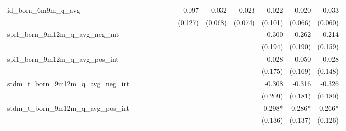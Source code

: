 \begin{tabular}{lrrrrrrrrrrrr}
id\_born\_6m9m\_q\_avg                      &              &              &              &              &              &              &       -0.097 &       -0.032 &       -0.023 &       -0.022 &       -0.020 &       -0.033 \\ 
                                            &              &              &              &              &              &              &      (0.127) &      (0.068) &      (0.074) &      (0.101) &      (0.066) &      (0.060) \\ 
spi1\_born\_9m12m\_q\_avg\_neg\_int         &              &              &              &              &              &              &              &              &              &       -0.300 &       -0.262 &       -0.214 \\ 
                                            &              &              &              &              &              &              &              &              &              &      (0.194) &      (0.190) &      (0.159) \\ 
spi1\_born\_9m12m\_q\_avg\_pos\_int         &              &              &              &              &              &              &              &              &              &        0.028 &        0.050 &        0.028 \\ 
                                            &              &              &              &              &              &              &              &              &              &      (0.175) &      (0.169) &      (0.148) \\ 
stdm\_t\_born\_9m12m\_q\_avg\_neg\_int      &              &              &              &              &              &              &              &              &              &       -0.308 &       -0.316 &       -0.326 \\ 
                                            &              &              &              &              &              &              &              &              &              &      (0.209) &      (0.181) &      (0.180) \\ 
stdm\_t\_born\_9m12m\_q\_avg\_pos\_int      &              &              &              &              &              &              &              &              &              &       0.298* &       0.286* &       0.266* \\ 
                                            &              &              &              &              &              &              &              &              &              &      (0.136) &      (0.137) &      (0.126) \\ 

\end{tabular}
